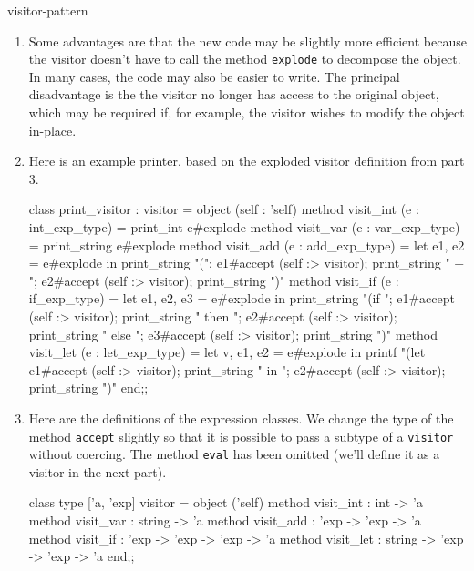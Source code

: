 \begin{exercise}{visitor-pattern}
\begin{answer}
\begin{enumerate}
\item 

Some advantages are that the new code may be slightly more efficient
because the visitor doesn't have to call the
method \hbox{\lstinline$explode$} to decompose the object.  In many cases,
the code may also be easier to write.  The principal disadvantage is
the the visitor no longer has access to the original object, which may
be required if, for example, the visitor wishes to modify the object
in-place.

\item

Here is an example printer, based on the exploded visitor definition from part 3.

\begin{ocaml}
class print_visitor : visitor =
  object (self : 'self)
    method visit_int (e : int_exp_type) =
       print_int e#explode
    method visit_var (e : var_exp_type) =
       print_string e#explode
    method visit_add (e : add_exp_type) =
       let e1, e2 = e#explode in
       print_string "(";
       e1#accept (self :> visitor);
       print_string " + ";
       e2#accept (self :> visitor);
       print_string ")"
    method visit_if (e : if_exp_type) =
       let e1, e2, e3 = e#explode in
       print_string "(if ";
       e1#accept (self :> visitor);
       print_string " then ";
       e2#accept (self :> visitor);
       print_string " else ";
       e3#accept (self :> visitor);
       print_string ")"
    method visit_let (e : let_exp_type) =
       let v, e1, e2 = e#explode in
       printf "(let %
       e1#accept (self :> visitor);
       print_string " in ";
       e2#accept (self :> visitor);
       print_string ")"
  end;;
\end{ocaml}

\item 

Here are the definitions of the expression classes.  We change
the type of the method \hbox{\lstinline$accept$} slightly so that it is
possible to pass a subtype of a \hbox{\lstinline$visitor$} without coercing.
The method \hbox{\lstinline$eval$} has been omitted (we'll define it
as a visitor in the next part).

\begin{ocaml}
class type ['a, 'exp] visitor =
  object ('self)
    method visit_int : int -> 'a
    method visit_var : string -> 'a
    method visit_add : 'exp -> 'exp -> 'a
    method visit_if  : 'exp -> 'exp -> 'exp -> 'a
    method visit_let : string -> 'exp -> 'exp -> 'a
  end;;


\end{ocaml}
\end{enumerate}
\end{answer}
\end{exercise}
